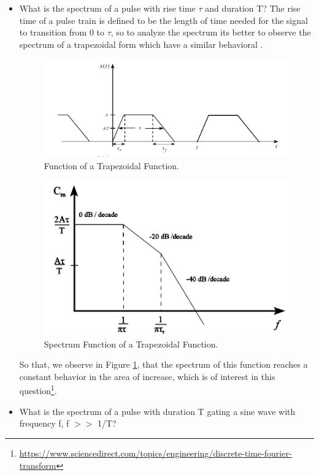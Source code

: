 \documentclass[12pt, twoside]{report}
\begin{document}
\begin{itemize}
    \item What is the spectrum of a pulse with rise time $\tau$ and duration T?
    The rise time of a pulse train is defined to be the length of time needed for the signal to transition from 0 to $\tau$, so to analyze the spectrum its better to observe the spectrum of a trapezoidal form which have a similar behavioral \cite{Bapfste}.
    \begin{figure}[!h]
    \centering
  \includegraphics[scale=0.6]{images/Trapezoideal.png}
  \caption{Function of a Trapezoidal Function.}
  \label{fig:trap1}
    \end{figure}
    \begin{figure}[!h]
    \centering
  \includegraphics[scale=0.6]{images/Trapezoideal1.png}
  \caption{Spectrum Function of a Trapezoidal Function.}
  \label{fig:trap1a}
    \end{figure}
    So that, we observe in Figure \ref{fig:trap1}, that the spectrum of this function reaches a constant behavior in the area of increase, which is of interest in this question\footnote{\url{https://www.sciencedirect.com/topics/engineering/discrete-time-fourier-transform}}.
    \item What is the spectrum of a pulse with duration T gating a sine wave with frequency f, f $>>$ 1/T?

\end{itemize}
\end{document}
